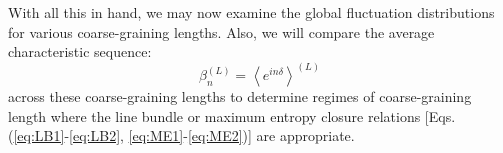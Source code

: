 With all this in hand, we may now examine the global fluctuation distributions for various coarse-graining lengths. Also, we will compare the average characteristic sequence: 
\begin{equation} \beta_{n}^{(L)} = \left\langle e^{in\delta} \right\rangle^{(L)} \end{equation} 
across these coarse-graining lengths to determine regimes of coarse-graining length where the line bundle or maximum entropy closure relations [Eqs. (\ref{eq:LB1}-\ref{eq:LB2}, \ref{eq:ME1}-\ref{eq:ME2})] are appropriate.
